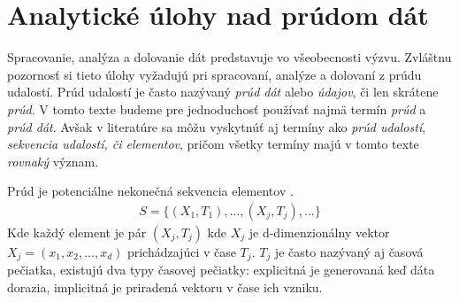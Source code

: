 \chapter{Analytické úlohy nad prúdom dát}
\label{Analytické úlohy v prúde dát}
Spracovanie, analýza a dolovanie dát predstavuje vo všeobecnosti výzvu. Zvláštnu pozornosť si tieto úlohy vyžadujú pri spracovaní, analýze a dolovaní z prúdu udalostí. Prúd udalostí je často nazývaný \textit{prúd dát} alebo \textit{údajov}, či len skrátene \textit{prúd}. V tomto texte budeme pre jednoduchosť používať najmä termín \textit{prúd} a \textit{prúd dát}. Avšak v literatúre sa môžu vyskytnúť aj termíny ako \textit{prúd udalostí}, \textit{sekvencia udalostí, či elementov}, pričom všetky termíny majú v tomto texte \textit{rovnaký} význam. 
\par
\begin{definition}{Prúd je potenciálne nekonečná sekvencia elementov \citep{tran2014change}.}
\begin{align*}
	S = \{(X_1,T_1), ..., (X_j,T_j), ...\}
\end{align*}
Kde každý element je pár $(X_j,T_j)$ kde $X_j$ je d-dimenzionálny vektor $X_j = (x_1, x_2, ..., x_d)$ prichádzajúci v čase $T_j$. $T_j$ je často nazývaný aj časová pečiatka, existujú dva typy časovej pečiatky: explicitná je generovaná keď dáta dorazia, implicitná je priradená vektoru v čase ich vzniku.
\end{definition}

